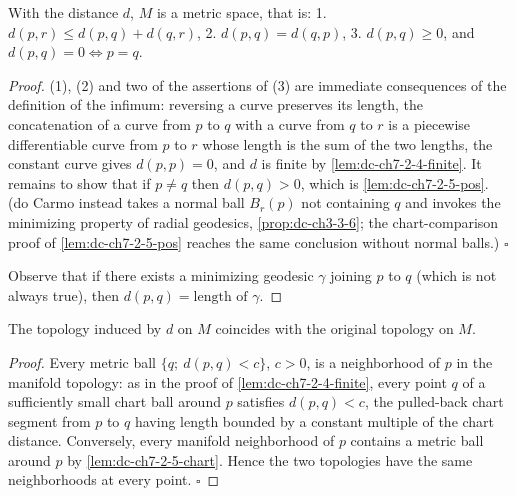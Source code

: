 \begin{proposition}[$d$ is a metric]
  \label{prop:dc-ch7-2-5}
  \leanok
  With the distance $d$, $M$ is a metric space, that is:
  1. $d(p,r)\le d(p,q)+d(q,r)$,
  2. $d(p,q)=d(q,p)$,
  3. $d(p,q)\ge 0$, and $d(p,q)=0\iff p=q$.
\end{proposition}
\begin{proof}
  \leanok
  (1), (2) and two of the assertions of (3) are immediate consequences of the
  definition of the infimum: reversing a curve preserves its length, the
  concatenation of a curve from $p$ to $q$ with a curve from $q$ to $r$ is a
  piecewise differentiable curve from $p$ to $r$ whose length is the sum of
  the two lengths, the constant curve gives $d(p,p)=0$, and $d$ is finite by
  \cref{lem:dc-ch7-2-4-finite}. It remains to show that if $p\ne q$ then
  $d(p,q)>0$, which is \cref{lem:dc-ch7-2-5-pos}. (do Carmo instead takes a
  normal ball $B_r(p)$ not containing $q$ and invokes the minimizing property
  of radial geodesics, \cref{prop:dc-ch3-3-6}; the chart-comparison proof of
  \cref{lem:dc-ch7-2-5-pos} reaches the same conclusion without normal
  balls.) $\square$

  Observe that if there exists a minimizing geodesic $\gamma$ joining $p$ to $q$
  (which is not always true), then $d(p,q)=\text{length of }\gamma$.
\end{proof}

\begin{proposition}
  \label{prop:dc-ch7-2-6}
  \mathlibok
  The topology induced by $d$ on $M$ coincides with the original topology on $M$.
\end{proposition}
\begin{proof}
  Every metric ball $\{q;\ d(p,q)<c\}$, $c>0$, is a neighborhood of $p$ in the
  manifold topology: as in the proof of \cref{lem:dc-ch7-2-4-finite}, every
  point $q$ of a sufficiently small chart ball around $p$ satisfies
  $d(p,q)<c$, the pulled-back chart segment from $p$ to $q$ having length
  bounded by a constant multiple of the chart distance. Conversely, every
  manifold neighborhood of $p$ contains a metric ball around $p$ by
  \cref{lem:dc-ch7-2-5-chart}. Hence the two topologies have the same
  neighborhoods at every point. $\square$
\end{proof}

